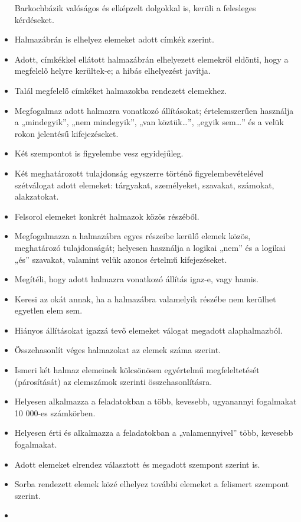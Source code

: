 \begin{itemize}
  Barkochbázik valóságos és elképzelt dolgokkal is, kerüli a felesleges
  kérdéseket.
\item
  Halmazábrán is elhelyez elemeket adott címkék szerint.
\item
  Adott, címkékkel ellátott halmazábrán elhelyezett elemekről eldönti,
  hogy a megfelelő helyre kerültek-e; a hibás elhelyezést javítja.
\item
  Talál megfelelő címkéket halmazokba rendezett elemekhez.
\item
  Megfogalmaz adott halmazra vonatkozó állításokat; értelemszerűen
  használja a „mindegyik'', „nem mindegyik'', „van köztük\ldots{}'',
  „egyik sem\ldots'' és a velük rokon jelentésű kifejezéseket.
\item
  Két szempontot is figyelembe vesz egyidejűleg.
\item
  Két meghatározott tulajdonság egyszerre történő figyelembevételével
  szétválogat adott elemeket: tárgyakat, személyeket, szavakat,
  számokat, alakzatokat.
\item
  Felsorol elemeket konkrét halmazok közös részéből.
\item
  Megfogalmazza a halmazábra egyes részeibe kerülő elemek közös,
  meghatározó tulajdonságát; helyesen használja a logikai „nem'' és a
  logikai „és'' szavakat, valamint velük azonos értelmű kifejezéseket.
\item
  Megítéli, hogy adott halmazra vonatkozó állítás igaz-e, vagy hamis.
\item
  Keresi az okát annak, ha a halmazábra valamelyik részébe nem kerülhet
  egyetlen elem sem.
\item
  Hiányos állításokat igazzá tevő elemeket válogat megadott
  alaphalmazból.
\item
  Összehasonlít véges halmazokat az elemek száma szerint.
\item
  Ismeri két halmaz elemeinek kölcsönösen egyértelmű megfeleltetését
  (párosítását) az elemszámok szerinti összehasonlításra.
\item
  Helyesen alkalmazza a feladatokban a több, kevesebb, ugyanannyi
  fogalmakat 10 000-es számkörben.
\item
  Helyesen érti és alkalmazza a feladatokban a „valamennyivel'' több,
  kevesebb fogalmakat.
\item
  Adott elemeket elrendez választott és megadott szempont szerint is.
\item
  Sorba rendezett elemek közé elhelyez további elemeket a felismert
  szempont szerint.
\item

\end{itemize}
